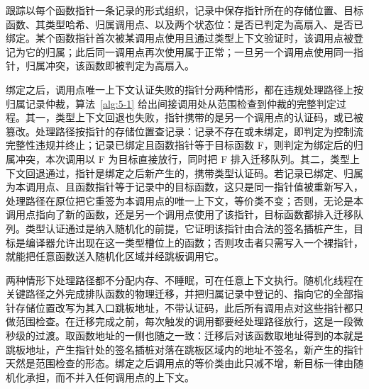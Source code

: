 跟踪以每个函数指针一条记录的形式组织，记录中保存指针所在的存储位置、目标函数、其类型哈希、归属调用点、以及两个状态位：是否已判定为高扇入、是否已绑定。某个函数指针首次被某调用点使用且通过类型上下文验证时，该调用点被登记为它的归属；此后同一调用点再次使用属于正常；一旦另一个调用点使用同一指针，归属冲突，该函数即被判定为高扇入。

绑定之后，调用点唯一上下文认证失败的指针分两种情形，都在违规处理路径上按归属记录仲裁，算法~\ref{alg:5-1} 给出间接调用处从范围检查到仲裁的完整判定过程。其一，类型上下文回退也失败，指针携带的是另一个调用点的认证码，或已被篡改。处理路径按指针的存储位置查记录：记录不存在或未绑定，即判定为控制流完整性违规并终止；记录已绑定且函数指针等于目标函数 F，则判定为绑定后的归属冲突，本次调用以 F 为目标直接放行，同时把 F 排入迁移队列。其二，类型上下文回退通过，指针是绑定之后新产生的，携带类型认证码。若记录已绑定、归属为本调用点、且函数指针等于记录中的目标函数，这只是同一指针值被重新写入，处理路径在原位把它重签为本调用点的唯一上下文，等价类不变；否则，无论是本调用点指向了新的函数，还是另一个调用点使用了该指针，目标函数都排入迁移队列。类型认证通过是纳入随机化的前提，它证明该指针由合法的签名插桩产生，目标是编译器允许出现在这一类型槽位上的函数；否则攻击者只需写入一个裸指针，就能把任意函数送入随机化区域并经跳板调用它。

两种情形下处理路径都不分配内存、不睡眠，可在任意上下文执行。随机化线程在关键路径之外完成排队函数的物理迁移，并把归属记录中登记的、指向它的全部指针存储位置改写为其入口跳板地址，不带认证码，此后所有调用点对这些指针都只做范围检查。在迁移完成之前，每次触发的调用都要经处理路径放行，这是一段微秒级的过渡。取函数地址的一侧也随之一致：迁移后对该函数取地址得到的本就是跳板地址，产生指针处的签名插桩对落在跳板区域内的地址不签名，新产生的指针天然是范围检查的形态。绑定之后调用点的等价类由此只减不增，新目标一律由随机化承担，而不并入任何调用点的上下文。

